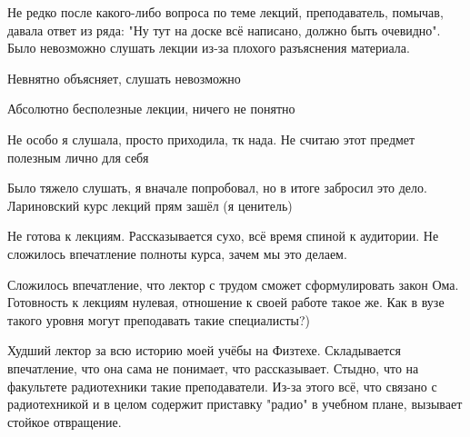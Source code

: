             \begin{commentbox} 
                Не редко после какого-либо вопроса по теме лекций, преподаватель, помычав, давала ответ из ряда: "Ну тут на доске всё написано, должно быть очевидно". Было невозможно слушать лекции из-за плохого разъяснения материала. 
            \end{commentbox} 
        
            \begin{commentbox} 
                Невнятно объясняет, слушать невозможно  
            \end{commentbox} 
        
            \begin{commentbox} 
                Абсолютно бесполезные лекции, ничего не понятно 
            \end{commentbox} 
        
            \begin{commentbox} 
                Не особо я слушала, просто приходила, тк нада. Не считаю этот предмет полезным лично для себя 
            \end{commentbox} 
        
            \begin{commentbox} 
                Было тяжело слушать, я вначале попробовал, но в итоге забросил это дело. Лариновский курс лекций прям зашёл (я ценитель) 
            \end{commentbox} 
        
            \begin{commentbox} 
                Не готова к лекциям. Рассказывается сухо, всё время спиной к аудитории. Не сложилось впечатление полноты курса, зачем мы это делаем. 
            \end{commentbox} 
        
            \begin{commentbox} 
                Сложилось впечатление, что лектор с трудом сможет сформулировать закон Ома. Готовность к лекциям нулевая, отношение к своей работе такое же. Как в вузе такого уровня могут преподавать такие специалисты?) 
            \end{commentbox} 
        
            \begin{commentbox} 
                Худший лектор за всю историю моей учёбы на Физтехе. Складывается впечатление, что она сама не понимает, что рассказывает. Стыдно, что на факультете радиотехники такие преподаватели. Из-за этого всё, что связано с радиотехникой и в целом содержит приставку "радио" в учебном плане, вызывает стойкое отвращение.  
            \end{commentbox} 
        

